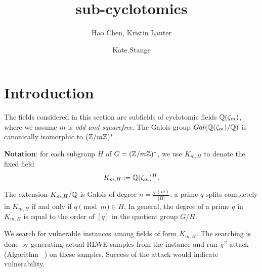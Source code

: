 \documentclass{amsart}
\title{sub-cyclotomics}
\author{Hao Chen, Kristin Lauter \and Kate Stange}
\begin{document}
\maketitle

\section{Introduction}

The fields considered in this section are subfields of cyclotomic fields $\mathbb{Q}(\zeta_m)$, where we assume $m$ is {\it odd and squarefree}. The Galois group $Gal(\mathbb{Q}(\zeta_m)/\mathbb{Q})$ is canonically isomorphic to $(\mathbb{Z}/m\mathbb{Z})^*$.

{\bf Notation}: for each subgroup $H$ of $G = (\mathbb{Z}/m\mathbb{Z})^*$, we use $K_{m,H}$ to denote the fixed field
\[
    K_{m,H} := \mathbb{Q}(\zeta_m)^H.
\]

The extension $K_{m,H}/\mathbb{Q}$ is Galois of degree $n = \frac{\varphi(m)}{|H|}$; a prime $q$ splits completely in $K_{m,H}$ if and only if $q \pmod{m} \in H$. In general, the degree of a prime $q$ in $K_{m,H}$ is equal to the order of $[q]$ in the quotient group $G/H$.


We search for vulnerable instances among fields of form $K_{m,H}$. The searching is done by generating actual RLWE samples from the instance and
run $\chi^2$ attack (Algorithm ~) on these samples. Success of the attack would indicate vulnerability.
\end{document}
